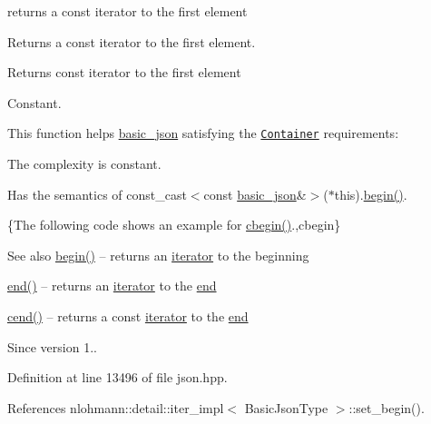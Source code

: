 returns a const iterator to the first element 

Returns a const iterator to the first element.

 \begin{DoxyReturn}{Returns}
const iterator to the first element
\end{DoxyReturn}
Constant.

This function helps {\ttfamily \hyperlink{classnlohmann_1_1basic__json}{basic\+\_\+json}} satisfying the \href{http://en.cppreference.com/w/cpp/concept/Container}{\tt Container} requirements\+:
\begin{DoxyItemize}
\item The complexity is constant.
\item Has the semantics of {\ttfamily const\+\_\+cast$<$const \hyperlink{classnlohmann_1_1basic__json}{basic\+\_\+json}\&$>$($\ast$this).\hyperlink{classnlohmann_1_1basic__json_a0ff28dac23f2bdecee9564d07f51dcdc}{begin()}}.
\end{DoxyItemize}

\{The following code shows an example for {\ttfamily \hyperlink{classnlohmann_1_1basic__json_ad865d6c291b237ae508d5cb2146b5877}{cbegin()}}.,cbegin\}

\begin{DoxySeeAlso}{See also}
\hyperlink{classnlohmann_1_1basic__json_a0ff28dac23f2bdecee9564d07f51dcdc}{begin()} -- returns an \hyperlink{classnlohmann_1_1basic__json_a099316232c76c034030a38faa6e34dca}{iterator} to the beginning 

\hyperlink{classnlohmann_1_1basic__json_a13e032a02a7fd8a93fdddc2fcbc4763c}{end()} -- returns an \hyperlink{classnlohmann_1_1basic__json_a099316232c76c034030a38faa6e34dca}{iterator} to the \hyperlink{classnlohmann_1_1basic__json_a13e032a02a7fd8a93fdddc2fcbc4763c}{end} 

\hyperlink{classnlohmann_1_1basic__json_a8dba7b7d2f38e6b0c614030aa43983f6}{cend()} -- returns a const \hyperlink{classnlohmann_1_1basic__json_a099316232c76c034030a38faa6e34dca}{iterator} to the \hyperlink{classnlohmann_1_1basic__json_a13e032a02a7fd8a93fdddc2fcbc4763c}{end}
\end{DoxySeeAlso}
\begin{DoxySince}{Since}
version 1.. 
\end{DoxySince}


Definition at line 13496 of file json.\+hpp.



References nlohmann\+::detail\+::iter\+\_\+impl$<$ Basic\+Json\+Type $>$\+::set\+\_\+begin().



